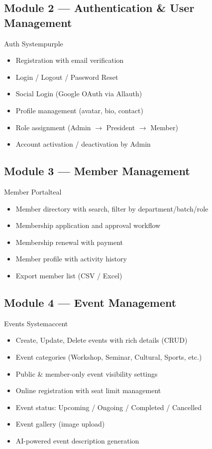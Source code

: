 \documentclass[12pt,a4paper]{article}
\begin{document}
\subsection{Module 2 --- Authentication \& User Management}
\begin{modulebox}{Auth System}{purple}
\begin{itemize}[leftmargin=*, itemsep=3pt]
  \item Registration with email verification
  \item Login / Logout / Password Reset
  \item Social Login (Google OAuth via Allauth)
  \item Profile management (avatar, bio, contact)
  \item Role assignment (Admin $\rightarrow$ President $\rightarrow$ Member)
  \item Account activation / deactivation by Admin
\end{itemize}
\end{modulebox}

\subsection{Module 3 --- Member Management}
\begin{modulebox}{Member Portal}{teal}
\begin{itemize}[leftmargin=*, itemsep=3pt]
  \item Member directory with search, filter by department/batch/role
  \item Membership application and approval workflow
  \item Membership renewal with payment
  \item Member profile with activity history
  \item Export member list (CSV / Excel)
\end{itemize}
\end{modulebox}

\subsection{Module 4 --- Event Management}
\begin{modulebox}{Events System}{accent}
\begin{itemize}[leftmargin=*, itemsep=3pt]
  \item Create, Update, Delete events with rich details (CRUD)
  \item Event categories (Workshop, Seminar, Cultural, Sports, etc.)
  \item Public \& member-only event visibility settings
  \item Online registration with seat limit management
  \item Event status: Upcoming / Ongoing / Completed / Cancelled
  \item Event gallery (image upload)
  \item AI-powered event description generation
\end{itemize}
\end{modulebox}
\end{document}
